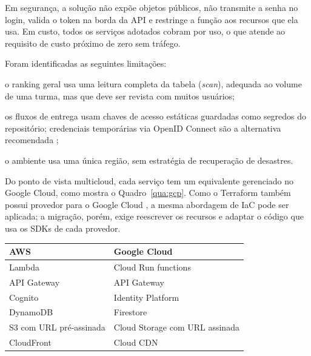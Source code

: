 \documentclass[article, 12pt, oneside, a4paper, english, brazil, sumario=tradicional]{abntex2}
\begin{document}
Em segurança, a solução não expõe objetos públicos, não transmite a senha no login, valida o token na borda da API e restringe a função aos recursos que ela usa. Em custo, todos os serviços adotados cobram por uso, o que atende ao requisito de custo próximo de zero sem tráfego.

Foram identificadas as seguintes limitações:

\begin{alineas}
  \item o ranking geral usa uma leitura completa da tabela (\textit{scan}), adequada ao volume de uma turma, mas que deve ser revista com muitos usuários;
  \item os fluxos de entrega usam chaves de acesso estáticas guardadas como segredos do repositório; credenciais temporárias via OpenID Connect são a alternativa recomendada \cite{ghoidc};
  \item o ambiente usa uma única região, sem estratégia de recuperação de desastres.
\end{alineas}

Do ponto de vista multicloud, cada serviço tem um equivalente gerenciado no Google Cloud, como mostra o Quadro~\ref{qua:gcp}. Como o Terraform também possui provedor para o Google Cloud \cite{terraformgoogle}, a mesma abordagem de IaC pode ser aplicada; a migração, porém, exige reescrever os recursos e adaptar o código que usa os SDKs de cada provedor.

\begin{quadro}[htb]
  \caption{\label{qua:gcp}Correspondência entre serviços da AWS e do Google Cloud}
  \begin{tabular}{|>{\raggedright\arraybackslash}p{5cm}|>{\raggedright\arraybackslash}p{9.7cm}|}
    \hline
    \textbf{AWS} & \textbf{Google Cloud} \\ \hline
    Lambda & Cloud Run functions \cite{gcprun} \\ \hline
    API Gateway & API Gateway \cite{gcpapigw} \\ \hline
    Cognito & Identity Platform \cite{gcpidentity} \\ \hline
    DynamoDB & Firestore \cite{gcpfirestore} \\ \hline
    S3 com URL pré-assinada & Cloud Storage com URL assinada \cite{gcpsigned} \\ \hline
    CloudFront & Cloud CDN \cite{gcpcdn} \\ \hline
  \end{tabular}
\end{quadro}
\end{document}
